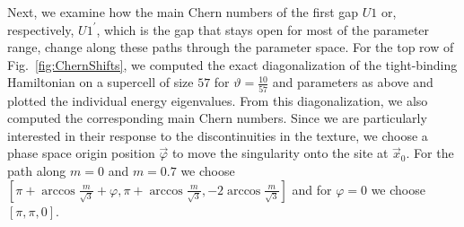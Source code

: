 \documentclass[submission, Phys]{SciPost}
\begin{document}
\figureXa
Next, we examine how the main Chern numbers of the first gap $U1$ or, respectively, $U1^{\prime}$, which is the gap that stays open for most of the parameter range, change along these paths through the parameter space.
For the top row of Fig.~\ref{fig:ChernShifts}, we computed the exact diagonalization of the tight-binding Hamiltonian on a supercell of size $57$ for $\vartheta=\frac{10}{57}$ and parameters as above and plotted the individual energy eigenvalues. From this diagonalization, we also computed the corresponding main Chern numbers.
Since we are particularly interested in their response to the discontinuities in the texture, we choose a phase space origin position $\vec{\varphi}$ to move the singularity onto the site at $\vec{x}_0$.
For the path along $m=0$ and $m=0.7$ we choose $[\pi+\arccos{\frac{m}{\sqrt{3}}}+\varphi,\pi+\arccos{\frac{m}{\sqrt{3}}},-2\arccos{\frac{m}{\sqrt{3}}}]$ and for $\varphi=0$ we choose $[\pi,\pi,0]$.
\end{document}
